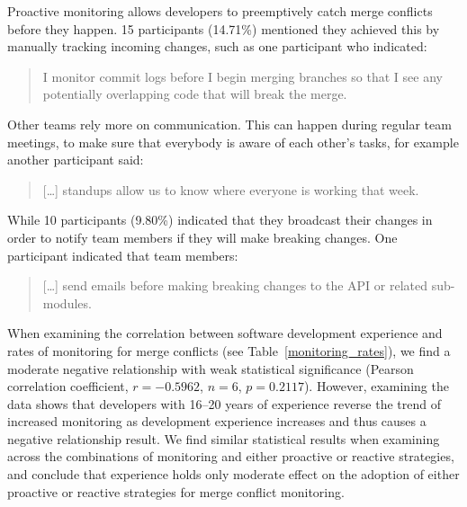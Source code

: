 Proactive monitoring allows developers to preemptively catch merge conflicts before they happen.
15 participants (14.71\%) mentioned they achieved this by manually tracking incoming changes, such as one participant who indicated:
\begin{quotation}
	I monitor commit logs before I begin merging branches so that I see any potentially overlapping code that will break the merge.
\end{quotation}
Other teams rely more on communication.
This can happen during regular team meetings, to make sure that everybody is aware of each other's tasks, for example another participant said:
\begin{quotation}
	[\ldots] standups allow us to know where everyone is working that week.
\end{quotation}
While 10 participants (9.80\%) indicated that they broadcast their changes in order to notify team members if they will make breaking changes.
One participant indicated that team members:
\begin{quotation}
	[\ldots] send emails before making breaking changes to the API or related sub-modules.
\end{quotation}

When examining the correlation between software development experience and rates of monitoring for merge conflicts (see Table~\ref{monitoring_rates}), we find a moderate negative relationship with weak statistical significance (Pearson correlation coefficient, $r=-0.5962$, $n=6$, $p=0.2117$).
However, examining the data shows that developers with 16--20 years of experience reverse the trend of increased monitoring as development experience increases and thus causes a negative relationship result.
We find similar statistical results when examining across the combinations of monitoring and either proactive or reactive strategies, and conclude that experience holds only moderate effect on the adoption of either proactive or reactive strategies for merge conflict monitoring.

